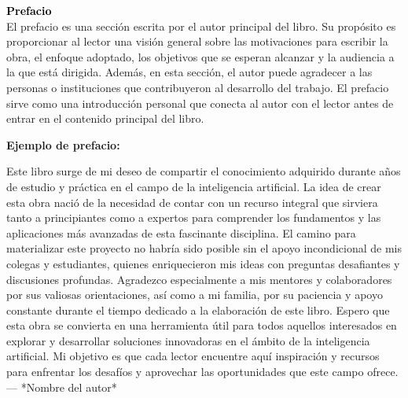 \vspace*{2cm}
\textcolor{black}{\Huge \textbf{Prefacio}} \\[0.7cm] %

El prefacio es una sección escrita por el autor principal del libro.
Su propósito es proporcionar al lector una visión general sobre las motivaciones para escribir la obra,
el enfoque adoptado, los objetivos que se esperan alcanzar y 
la audiencia a la que está dirigida. Además, en esta sección, 
el autor puede agradecer a las personas o instituciones que contribuyeron al desarrollo del trabajo.
El prefacio sirve como una introducción personal que conecta al autor con el lector antes de entrar
en el contenido principal del libro.


\textbf{Ejemplo de prefacio:}

Este libro surge de mi deseo de compartir el conocimiento adquirido durante años de estudio 
y práctica en el campo de la inteligencia artificial. La idea de crear esta obra nació de la 
necesidad de contar con un recurso integral que sirviera tanto a principiantes como a expertos para 
comprender los fundamentos y las aplicaciones más avanzadas de esta fascinante disciplina.
El camino para materializar este proyecto no habría sido posible sin el apoyo incondicional de mis 
colegas y estudiantes, quienes enriquecieron mis ideas con preguntas desafiantes y discusiones 
profundas. Agradezco especialmente a mis mentores y colaboradores por sus valiosas orientaciones, 
así como a mi familia, por su paciencia y apoyo constante durante el tiempo dedicado a la elaboración 
de este libro.
Espero que esta obra se convierta en una herramienta útil para todos aquellos interesados en explorar 
y desarrollar soluciones innovadoras en el ámbito de la inteligencia artificial. Mi objetivo es que 
cada lector encuentre aquí inspiración y recursos para enfrentar los desafíos y aprovechar las 
oportunidades que este campo ofrece.
--- *Nombre del autor*  
\clearpage